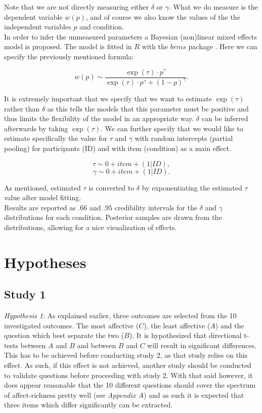 \documentclass[12pt]{article}
\begin{document}
Note that we are not directly measuring either
$\delta$ or $\gamma$. What we do measure is the
dependent variable $w(p)$, and of course
we also know the values of the the independent
variables $p$ and condition. \\

In order to infer the
unmeasured parameters a Bayesian (non)linear
mixed effects model is proposed. The model
is fitted in $R$ \autocite{rcore}
with the  $brms$ package \autocite{brms}.
Here we can specify the previously
mentioned formula:

 \[
	 w(p) \sim \frac{\exp({\tau})\cdot p^{\gamma}}
	 {\exp({\tau})\cdot p^{\gamma}+(1-p)^{\gamma}}
.\]

It is extremely important that we specify
that we want to estimate $\exp(\tau)$ rather
than  $\delta$ as this tells the models that
this parameter must be positive and thus
limits the flexibility of the model in an
appropriate way.  $\delta$ can be inferred
afterwards by taking  $\exp(\tau)$.
We can further specify that we would like to
estimate specifically the value for $\tau$
and $\gamma$ with random intercepts (partial pooling)
for participants (ID) and with item (condition)
as a main
effect.

 \[
	 \tau \sim 0 + item + (1|ID),
\]
\[
	\gamma \sim 0 + item + (1|ID)
.\]

As mentioned, estimated $\tau$ is converted
to $\delta$ by exponentiating the estimated
$\tau$ value after model fitting. \\

Results are reported as $.66$ and $.95$
credibility intervals
for the $\delta$ and $\gamma$ distributions
for each condition. Posterior samples
are drawn from the distributions, allowing
for a nice visualization of effects.

\section{Hypotheses}

\subsection{Study 1}
\emph{Hypothesis 1}: As explained earlier,
three outcomes are selected from the
10 investigated outcomes. The most
affective ($C$), the least affective ($A$) and the
question which best separate the two ($B$).
It is hypothesized that directional t-tests
between $A$ and  $B$ and between  $B$ and  $C$
will result in significant differences.
This has to be achieved before conducting
study 2, as that study relies on this effect.
As such, if this effect is not achieved, another
study should be conducted to validate questions
before proceeding with study 2. With that said
however, it does appear reasonable that
the 10 different questions should cover the
spectrum of affect-richness pretty well
(see \emph{Appendix A}) and as such it is
expected that three items which differ significantly
can be extracted.
\end{document}
